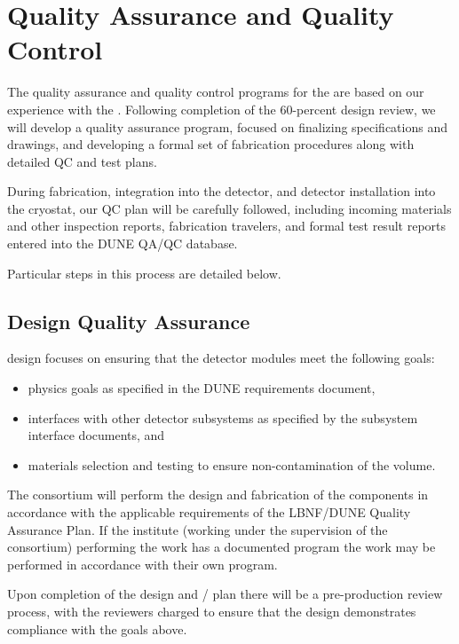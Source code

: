 \section{Quality Assurance and Quality Control}
\label{sec:fdsp-pd-qaqc}

The quality assurance and quality control programs for the  are based on our experience with the .  Following completion of the 60-percent design review, we will develop a quality assurance program, focused on finalizing specifications and drawings, and developing a formal set of fabrication procedures along with detailed QC and test plans.

During fabrication, integration into the detector, and detector installation into the cryostat, our QC plan will be carefully followed, including incoming materials and other inspection reports, fabrication travelers, and formal test result reports entered into the DUNE QA/QC database.

Particular steps in this process are detailed below.

\subsection{Design Quality Assurance}
\label{sec:fdsp-pd-designqa}

 design  focuses on ensuring that the detector modules meet the following goals:
\begin{itemize}
\item physics goals as specified in the DUNE requirements document,
\item interfaces with other detector subsystems as specified by the subsystem interface documents, and
\item materials selection and testing to ensure non-contamination of the \lar volume.
\end{itemize}

The  consortium will perform the design and fabrication of the components in accordance with the applicable requirements of the LBNF/DUNE Quality Assurance Plan. If the institute (working under the supervision of the consortium) performing the work has a documented  program the work may be performed in accordance with their own program.

Upon completion of the  design and / plan there will be a pre-production review process, with the reviewers charged to ensure that the design demonstrates compliance with the goals above.

